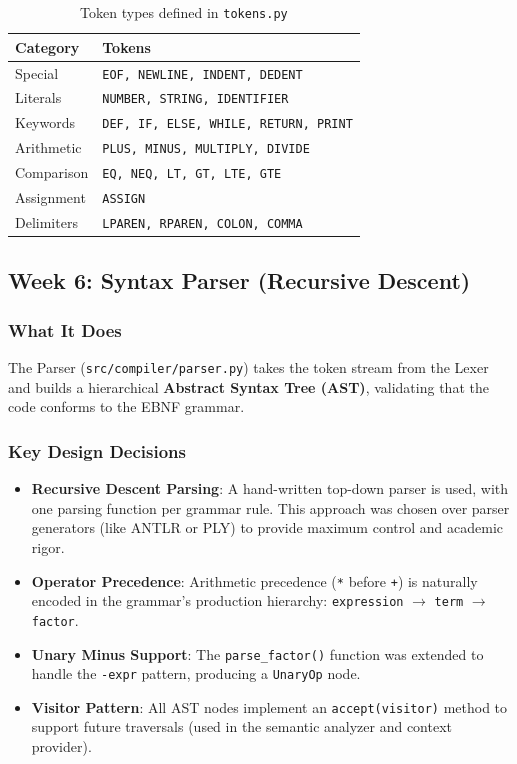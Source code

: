 \documentclass[a4paper,11pt]{article}
\begin{document}
\begin{table}[h!]
\centering
\begin{tabular}{|l|l|}
\hline
\rowcolor{blue!10}
\textbf{Category} & \textbf{Tokens} \\
\hline
Special & \texttt{EOF, NEWLINE, INDENT, DEDENT} \\
\hline
Literals & \texttt{NUMBER, STRING, IDENTIFIER} \\
\hline
Keywords & \texttt{DEF, IF, ELSE, WHILE, RETURN, PRINT} \\
\hline
Arithmetic & \texttt{PLUS, MINUS, MULTIPLY, DIVIDE} \\
\hline
Comparison & \texttt{EQ, NEQ, LT, GT, LTE, GTE} \\
\hline
Assignment & \texttt{ASSIGN} \\
\hline
Delimiters & \texttt{LPAREN, RPAREN, COLON, COMMA} \\
\hline
\end{tabular}
\caption{Token types defined in \texttt{tokens.py}}
\end{table}

\subsection{Week 6: Syntax Parser (Recursive Descent)}

\subsubsection{What It Does}

The Parser (\texttt{src/compiler/parser.py}) takes the token stream from the Lexer and builds a hierarchical \textbf{Abstract Syntax Tree (AST)}, validating that the code conforms to the EBNF grammar.

\subsubsection{Key Design Decisions}

\begin{itemize}
    \item \textbf{Recursive Descent Parsing}: A hand-written top-down parser is used, with one parsing function per grammar rule. This approach was chosen over parser generators (like ANTLR or PLY) to provide maximum control and academic rigor.
    \item \textbf{Operator Precedence}: Arithmetic precedence (\texttt{*} before \texttt{+}) is naturally encoded in the grammar's production hierarchy: \texttt{expression} $\rightarrow$ \texttt{term} $\rightarrow$ \texttt{factor}.
    \item \textbf{Unary Minus Support}: The \texttt{parse\_factor()} function was extended to handle the \texttt{-expr} pattern, producing a \texttt{UnaryOp} node.
    \item \textbf{Visitor Pattern}: All AST nodes implement an \texttt{accept(visitor)} method to support future traversals (used in the semantic analyzer and context provider).
\end{itemize}
\end{document}
